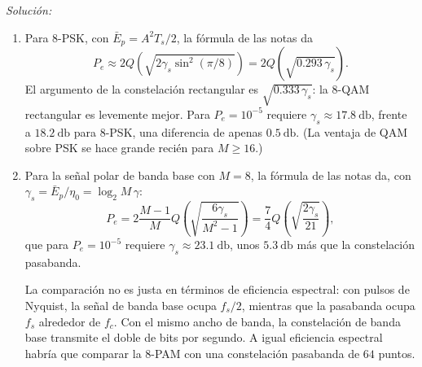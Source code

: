 \documentclass[a4paper,11pt]{article}
\newenvironment{solucion}[1][]{
\noindent \large \textsl{Solución:} \ifthenelse{\equal{#1}{}}{}{\emph{(#1)}}

\smallskip
}{
\bigskip
}
\begin{document}
\begin{solucion}
\begin{enumerate}
                \item Para $8$-PSK, con $\bar E_p=A^2T_s/2$, la fórmula de las notas da
                \begin{equation*}
                        P_e \approx 2 Q\left(\sqrt{2\gamma_s\sin^2(\pi/8)}\right)=2Q\left(\sqrt{0.293\,\gamma_s}\right).
                \end{equation*}
                El argumento de la constelación rectangular es $\sqrt{0.333\,\gamma_s}$: la $8$-QAM rectangular es levemente mejor. Para $P_e=10^{-5}$ requiere $\gamma_s\approx 17.8\ \unit{\decibel}$, frente a $18.2\ \unit{\decibel}$ para $8$-PSK, una diferencia de apenas $0.5\ \unit{\decibel}$. (La ventaja de QAM sobre PSK se hace grande recién para $M\geqslant16$.)
                \begin{center}
                        
                \end{center}

                \item Para la señal polar de banda base con $M=8$, la fórmula de las notas da, con $\gamma_s=\bar E_p/\eta_0=\log_2 M\,\gamma$:
                \begin{equation*}
                        P_e = 2 \frac{M-1}{M} Q\left(\sqrt{\frac{6\gamma_s}{M^2-1}}\right)=\frac74 Q\left(\sqrt{\frac{2\gamma_s}{21}}\right),
                \end{equation*}
                que para $P_e=10^{-5}$ requiere $\gamma_s\approx 23.1\ \unit{\decibel}$, unos $5.3\ \unit{\decibel}$ más que la constelación pasabanda.
                \begin{center}
                        
                \end{center}
                La comparación no es justa en términos de eficiencia espectral: con pulsos de Nyquist, la señal de banda base ocupa $f_s/2$, mientras que la pasabanda ocupa $f_s$ alrededor de $f_c$. Con el mismo ancho de banda, la constelación de banda base transmite el doble de bits por segundo. A igual eficiencia espectral habría que comparar la $8$-PAM con una constelación pasabanda de $64$ puntos.


\end{enumerate}
\end{solucion}
\end{document}
